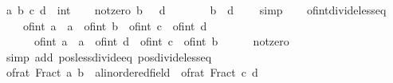 \begin{isabellebody}
\ a\ b\ c\ d\ {\isacharcolon}{\kern0pt}{\isacharcolon}{\kern0pt}\ int\isanewline
\ \ \isamarkupfalse%
\ not{\isacharunderscore}{\kern0pt}zero{\isacharcolon}{\kern0pt}\ {\isachardoublequoteopen}b\ {\isachargreater}{\kern0pt}\ {}{\isachardoublequoteclose}\ {\isachardoublequoteopen}d\ {\isachargreater}{\kern0pt}\ {}{\isachardoublequoteclose}\isanewline
\ \ \isamarkupfalse%
\ \isamarkupfalse%
\ {\isachardoublequoteopen}b\ {\isacharasterisk}{\kern0pt}\ d\ {\isachargreater}{\kern0pt}\ {}{\isachardoublequoteclose}\ \isamarkupfalse%
\ simp\isanewline
\ \ \isamarkupfalse%
\ of{\isacharunderscore}{\kern0pt}int{\isacharunderscore}{\kern0pt}divide{\isacharunderscore}{\kern0pt}less{\isacharunderscore}{\kern0pt}eq{\isacharcolon}{\kern0pt}\isanewline
\ \ \ \ {\isachardoublequoteopen}{\isacharparenleft}{\kern0pt}of{\isacharunderscore}{\kern0pt}int\ a\ {\isacharcolon}{\kern0pt}{\isacharcolon}{\kern0pt}\ {\isacharprime}{\kern0pt}a{\isacharparenright}{\kern0pt}\ {\isacharslash}{\kern0pt}\ of{\isacharunderscore}{\kern0pt}int\ b\ {\isacharless}{\kern0pt}\ of{\isacharunderscore}{\kern0pt}int\ c\ {\isacharslash}{\kern0pt}\ of{\isacharunderscore}{\kern0pt}int\ d\ {\isasymlongleftrightarrow}\isanewline
\ \ \ \ \ \ {\isacharparenleft}{\kern0pt}of{\isacharunderscore}{\kern0pt}int\ a\ {\isacharcolon}{\kern0pt}{\isacharcolon}{\kern0pt}\ {\isacharprime}{\kern0pt}a{\isacharparenright}{\kern0pt}\ {\isacharasterisk}{\kern0pt}\ of{\isacharunderscore}{\kern0pt}int\ d\ {\isacharless}{\kern0pt}\ of{\isacharunderscore}{\kern0pt}int\ c\ {\isacharasterisk}{\kern0pt}\ of{\isacharunderscore}{\kern0pt}int\ b{\isachardoublequoteclose}\isanewline
\ \ \ \ \isamarkupfalse%
\ not{\isacharunderscore}{\kern0pt}zero\ \isamarkupfalse%
\ {\isacharparenleft}{\kern0pt}simp\ add{\isacharcolon}{\kern0pt}\ pos{\isacharunderscore}{\kern0pt}less{\isacharunderscore}{\kern0pt}divide{\isacharunderscore}{\kern0pt}eq\ pos{\isacharunderscore}{\kern0pt}divide{\isacharunderscore}{\kern0pt}less{\isacharunderscore}{\kern0pt}eq{\isacharparenright}{\kern0pt}\isanewline
\ \ \isamarkupfalse%
\ {\isachardoublequoteopen}{\isacharparenleft}{\kern0pt}of{\isacharunderscore}{\kern0pt}rat\ {\isacharparenleft}{\kern0pt}Fract\ a\ b{\isacharparenright}{\kern0pt}\ {\isacharcolon}{\kern0pt}{\isacharcolon}{\kern0pt}\ {\isacharprime}{\kern0pt}a{\isacharcolon}{\kern0pt}{\isacharcolon}{\kern0pt}linordered{\isacharunderscore}{\kern0pt}field{\isacharparenright}{\kern0pt}\ {\isacharless}{\kern0pt}\ of{\isacharunderscore}{\kern0pt}rat\ {\isacharparenleft}{\kern0pt}Fract\ c\ d{\isacharparenright}{\kern0pt}\ {\isasymlongleftrightarrow}\isanewline

\end{isabellebody}
